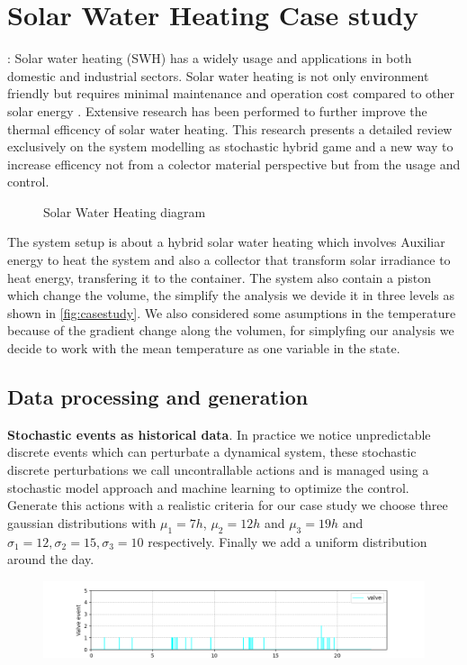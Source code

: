   \section{Solar Water Heating Case study}: 
    \label{sec:casestudy}
    Solar water heating (SWH) has a widely usage and applications in 
    both domestic and industrial sectors. Solar water heating is not only 
    environment friendly but requires minimal maintenance and operation 
    cost compared to other solar energy \cite{shukla2013recent}. Extensive
    research has been performed to further improve the thermal efficency of
    solar water heating. This research presents a detailed review exclusively
    on the system modelling as stochastic hybrid game and a new way to increase
    efficency not from a colector material perspective but from the usage 
    and control.
    \begin{figure}[!hbt]
      \centering
      
      \captionsetup{format=hang}
      \caption{Solar Water Heating diagram}
      \label{fig:casestudy}
    \end{figure}
    The system setup is about a hybrid solar water heating which involves 
    Auxiliar energy to heat the system and also a collector that transform 
    solar irradiance to heat energy, transfering it to the container. The system also
    contain a piston which change the volume, the simplify the analysis 
    we devide it in three levels as shown in \autoref{fig:casestudy}. We also 
    considered some asumptions in the temperature because of the gradient change
    along the volumen, for simplyfing our analysis we decide to work with 
    the mean temperature as one variable in the state.
    \clearpage 
    \subsection{Data processing and generation}      
      \textbf{Stochastic events as historical data}. In practice
      we notice unpredictable discrete events which can perturbate a dynamical 
      system, these stochastic discrete perturbations we call uncontrallable actions and 
      is managed using a stochastic model approach and machine learning to optimize
      the control. Generate this actions with a realistic criteria for our case study 
      we choose three gaussian distributions with $\mu_1 = 7h$, $\mu_2 = 12h$ and $\mu_3 = 19h$
      and $\sigma_1=12,\sigma_2=15, \sigma_3=10$ respectively. Finally we add 
      a uniform distribution around the day.
      \begin{figure}[!hbt]      
        \centering
        \includegraphics[width=1.2\linewidth]{images/uncontrollable}      
        \captionsetup{format=hang}
        \label{fig:uncontrollable}
      \end{figure}

